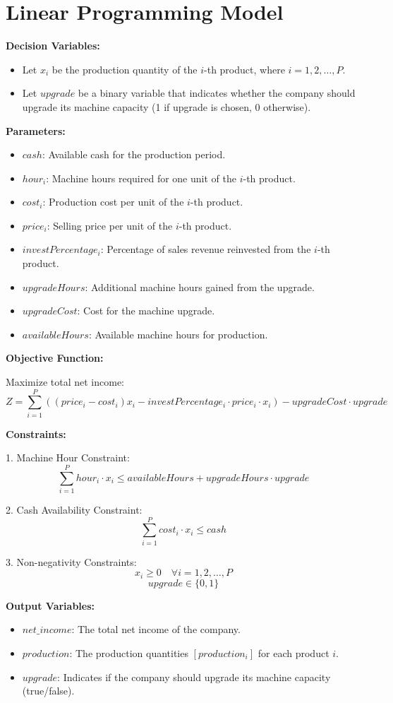 \documentclass{article}
\begin{document}
\section*{Linear Programming Model}

\textbf{Decision Variables:}
\begin{itemize}
    \item Let \( x_i \) be the production quantity of the \( i \)-th product, where \( i = 1, 2, \ldots, P \).
    \item Let \( upgrade \) be a binary variable that indicates whether the company should upgrade its machine capacity (1 if upgrade is chosen, 0 otherwise).
\end{itemize}

\textbf{Parameters:}
\begin{itemize}
    \item \( cash \): Available cash for the production period.
    \item \( hour_i \): Machine hours required for one unit of the \( i \)-th product.
    \item \( cost_i \): Production cost per unit of the \( i \)-th product.
    \item \( price_i \): Selling price per unit of the \( i \)-th product.
    \item \( investPercentage_i \): Percentage of sales revenue reinvested from the \( i \)-th product.
    \item \( upgradeHours \): Additional machine hours gained from the upgrade.
    \item \( upgradeCost \): Cost for the machine upgrade.
    \item \( availableHours \): Available machine hours for production.
\end{itemize}

\textbf{Objective Function:}

Maximize total net income:
\[
Z = \sum_{i=1}^{P} \left( (price_i - cost_i) x_i - investPercentage_i \cdot price_i \cdot x_i \right) - upgradeCost \cdot upgrade
\]

\textbf{Constraints:}

1. Machine Hour Constraint:
\[
\sum_{i=1}^{P} hour_i \cdot x_i \leq availableHours + upgradeHours \cdot upgrade
\]

2. Cash Availability Constraint:
\[
\sum_{i=1}^{P} cost_i \cdot x_i \leq cash
\]

3. Non-negativity Constraints:
\[
x_i \geq 0 \quad \forall i = 1, 2, \ldots, P
\]
\[
upgrade \in \{0, 1\}
\]

\textbf{Output Variables:}
\begin{itemize}
    \item \( net\_income \): The total net income of the company.
    \item \( production \): The production quantities \( [production_i] \) for each product \( i \).
    \item \( upgrade \): Indicates if the company should upgrade its machine capacity (true/false).
\end{itemize}
\end{document}
